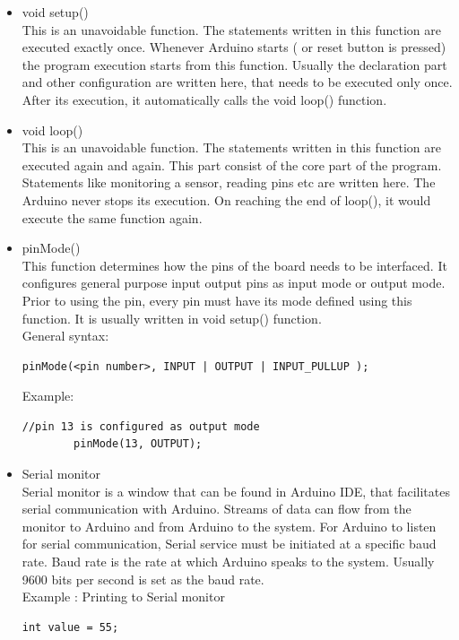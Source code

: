 \begin{itemize}
    \item void setup()\\
    This is an unavoidable function. The statements written in this function are executed exactly once. Whenever Arduino starts ( or reset button is pressed) the program execution starts from this function. Usually the declaration part and other configuration are written here, that needs to be executed only once. After its execution, it automatically calls the void loop() function.
    
    \item void loop()\\
    This is an unavoidable function. The statements written in this function are executed again and again. This part consist of the core part of the program. Statements like monitoring a sensor, reading pins etc are written here. The Arduino never stops its execution. On reaching the end of loop(), it would execute the same function again.
    
    \item pinMode() \\
    This function determines how the pins of the board needs to be interfaced. It configures general purpose input output pins as input mode or output mode. Prior to using the pin, every pin must have its mode defined using this function. It is usually written in void setup() function.\\
    General syntax:
    \begin{lstlisting}[style=CStyle]
        pinMode(<pin number>, INPUT | OUTPUT | INPUT_PULLUP );
    \end{lstlisting}
    Example:
    \begin{lstlisting}[style=CStyle]
        //pin 13 is configured as output mode
        pinMode(13, OUTPUT);  
    \end{lstlisting}
    
    \item Serial monitor\\
    Serial monitor is a window that can be found in Arduino \ac{IDE}, that facilitates serial communication with Arduino. Streams of data can flow from the monitor to Arduino and from Arduino to the system. For Arduino to listen for serial communication, Serial service must be initiated at a specific baud rate. Baud rate is the rate at which Arduino speaks to the system. Usually 9600 bits per second is set as the baud rate.\\ 
    Example : Printing to Serial monitor
    \begin{lstlisting}[style=CStyle]
    int value = 55;
    

\end{lstlisting}
\end{itemize}
